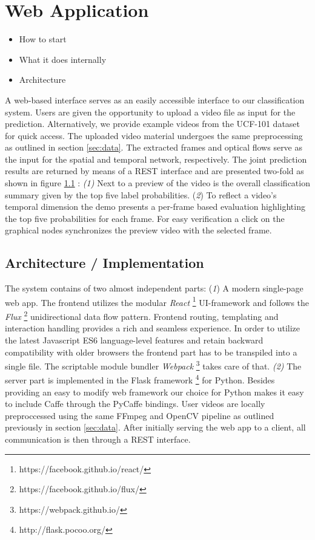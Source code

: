 \section{Web Application}
\label{sec:web}
\begin{itemize}
	\item How to start
	\item What it does internally
	\item Architecture
\end{itemize}

A web-based interface serves as an easily accessible interface to our classification system. Users are given the opportunity to upload a video file as input for the prediction. Alternatively, we provide example videos from the UCF-101 dataset for quick access.
The uploaded video material undergoes the same preprocessing as outlined in section \ref{sec:data}. The extracted frames and optical flows serve as the input for the spatial and temporal network, respectively.
The joint prediction results are returned by means of a REST interface and are presented two-fold as shown in figure \ref{} : \textit{(1)} Next to a preview of the video is the overall classification summary given by the top five label probabilities. (\textit{2}) To reflect a video’s temporal dimension the demo presents a per-frame based evaluation highlighting the top five probabilities for each frame. For easy verification a click on the graphical nodes synchronizes the preview video with the selected frame.

\subsection{Architecture / Implementation}
The system contains of two almost independent parts: (\textit{1}) A modern single-page web app. The frontend utilizes the modular \textit{React} \footnote{https://facebook.github.io/react/} UI-framework and follows the \textit{Flux} \footnote{https://facebook.github.io/flux/} unidirectional data flow pattern. Frontend routing, templating and interaction handling provides a rich and seamless experience. In order to utilize the latest Javascript ES6 language-level features and retain backward compatibility with older browsers the frontend part has to be transpiled into a single file. The scriptable module bundler \textit{Webpack} \footnote{https://webpack.github.io/} takes care of that. \newline
\textit{(2)} The server part is implemented in the Flask framework \footnote{http://flask.pocoo.org/} for Python. Besides providing an easy to modify web framework our choice for Python makes it easy to include Caffe through the PyCaffe bindings. User videos are locally preproccessed using the same FFmpeg and OpenCV pipeline as outlined previously in section \ref{sec:data}. After initially serving the web app to a client, all communication is then through a REST interface. 

